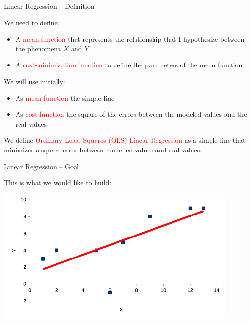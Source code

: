 \documentclass{beamer}
\begin{document}
\begin{frame}
{\centerline{Linear Regression -- Definition}}
We need to define:
\begin{itemize}
\item A \textcolor{red}{mean function} that represents the relationship that I hypothesize between the phenomena $X$ and $Y$\\
\item A \textcolor{red}{cost-minimization function} to define the parameters of the mean function
\end{itemize}
\vspace*{0.5cm}
We will use initially:
\begin{itemize}
\item As \textcolor{red}{mean function} the simple line\\
\item As \textcolor{red}{cost function} the square of the errors between the modeled values and the real values
\end{itemize}
\vspace*{0.5cm}
We define \textcolor{red}{Ordinary Least Squares (OLS) Linear Regression} as a simple line that minimizes a square error between modelled values and real values.
\end{frame}

\begin{frame}
{\centerline{Linear Regression -- Goal}}

This is what we would like to build:

\begin{center}
\includegraphics[width=12cm]{A2022.IDSEPC.RegressioneLineare/LinearRegression_OLS.png}
\end{center}



\end{frame}
\end{document}
